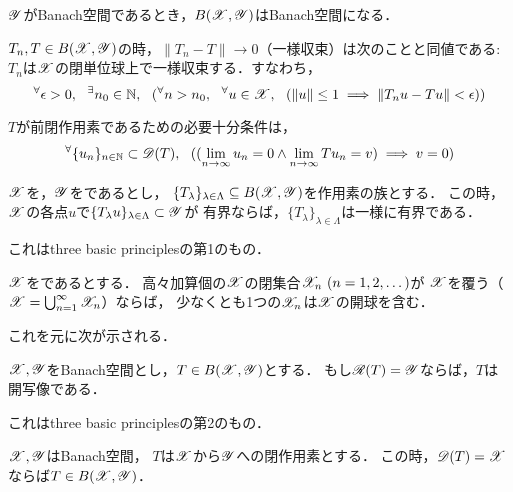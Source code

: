     \begin{Them}[定理7.6, p.150] \label{them7:6}
        $\mathscr{Y}$がBanach空間であるとき，$B(\mathscr{X}, \mathscr{Y})$はBanach空間になる．
    \end{Them}

    \begin{Them}[定理7.8, p.153] \label{them7:8}
        $T_n, T \in B(\mathscr{X}, \mathscr{Y})$の時，$\|T_n - T\| \to 0$（一様収束）は次のことと同値である:
        $T_n$は$\mathscr{X}$の閉単位球上で一様収束する．すなわち，
        \[ {}^{\forall} \epsilon>0,~~ {}^{\exists} n_0 \in \mathbb{N},~~ ( {}^{\forall} n>n_0,~~ {}^{\forall} u \in \mathscr{X},~~ (\|u\| \leq 1 \implies \|T_n u - T u\|<\epsilon)) \]
    \end{Them}
    \begin{Them}[定理7.20 (i), p.166] \label{them7:20}
        $T$が前閉作用素であるための必要十分条件は，
        \[ {}^{\forall} \{ u_n \}_{n \in \mathbb{N}} \subset \mathscr{D}(T),~~ ((\lim_{n \to \infty}u_n=0  \land \lim_{n \to \infty}Tu_n=v) \implies v=0) \]
    \end{Them}

    \begin{Them}[定理7.21, p.166, 一様有界性の原理] \label{them7:21}
        $\mathscr{X}$を，$\mathscr{Y}$をであるとし，
        $\{ T_{\lambda} \}_{\lambda \in \Lambda} \subseteq B(\mathscr{X}, \mathscr{Y})$を作用素の族とする．
        この時，$\mathscr{X}$の各点$u$で$\{ T_{\lambda}u \}_{\lambda \in \Lambda} \subset \mathscr{Y}$が
        有界ならば，$\{ T_{\lambda} \}_{\lambda \in \Lambda}$は一様に有界である．
    \end{Them}
    これはthree basic principlesの第1のもの．

    \begin{Them}[定理7.23, p.167, Baireのカテゴリー定理] \label{them7:23}
        $\mathscr{X}$をであるとする．
        高々加算個の$\mathscr{X}$の閉集合$\mathscr{X}_n ~(n=1,2,\dots)$が
        $\mathscr{X}$を覆う（$\mathscr{X}=\bigcup_{n=1}^{\infty}{\mathscr{X}_n}$）ならば，
        少なくとも1つの$\mathscr{X}_n$は$\mathscr{X}$の開球を含む．
    \end{Them}
    これを元に次が示される．

    \begin{Them}[定理7.30, p.170, 開写像原理] \label{them7:30}
        $\mathscr{X}, \mathscr{Y}$をBanach空間とし，$T \in B(\mathscr{X}, \mathscr{Y})$とする．
        もし$\mathscr{R}(T)=\mathscr{Y}$ならば，$T$は開写像である．
    \end{Them}
    これはthree basic principlesの第2のもの．

    \begin{Them}[定理7.33, p.172, 閉グラフ定理] \label{them7:33}
        $\mathscr{X}, \mathscr{Y}$はBanach空間，
        $T$は$\mathscr{X}$から$\mathscr{Y}$への閉作用素とする．
        この時，$\mathscr{D}(T)=\mathscr{X}$ならば$T \in B(\mathscr{X}, \mathscr{Y})$．
    \end{Them}

